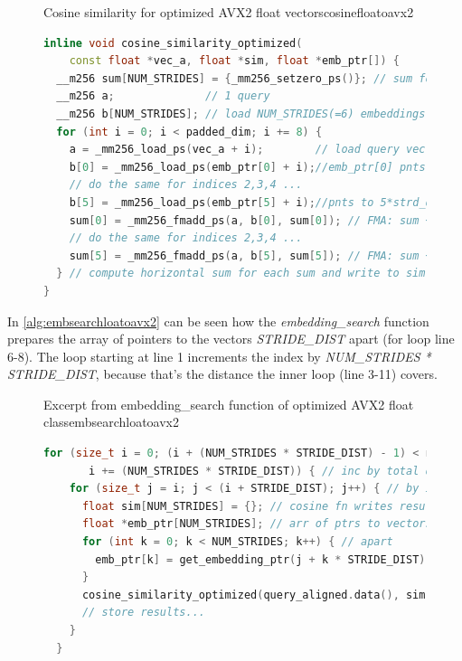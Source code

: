 \begin{figure}[h]
    \begin{algorithm}{Cosine similarity for optimized AVX2 float vectors}{cosinefloatoavx2}
        \begin{lstlisting}[language=C++]
inline void cosine_similarity_optimized(
    const float *vec_a, float *sim, float *emb_ptr[]) {
  __m256 sum[NUM_STRIDES] = {_mm256_setzero_ps()}; // sum for all embeds
  __m256 a;              // 1 query
  __m256 b[NUM_STRIDES]; // load NUM_STRIDES(=6) embeddings at once
  for (int i = 0; i < padded_dim; i += 8) {
    a = _mm256_load_ps(vec_a + i);        // load query vec
    b[0] = _mm256_load_ps(emb_ptr[0] + i);//emb_ptr[0] pnts to curr. vec
    // do the same for indices 2,3,4 ...
    b[5] = _mm256_load_ps(emb_ptr[5] + i);//pnts to 5*strd_dst vec ahead
    sum[0] = _mm256_fmadd_ps(a, b[0], sum[0]); // FMA: sum += a * b[0]
    // do the same for indices 2,3,4 ...
    sum[5] = _mm256_fmadd_ps(a, b[5], sum[5]); // FMA: sum += a * b[5]
  } // compute horizontal sum for each sum and write to sim array ...
}
    \end{lstlisting}
    \end{algorithm}
\end{figure}
In \autoref{alg:embsearchloatoavx2} can be seen how the \textit{embedding\_search} function prepares the array of pointers to the vectors \textit{STRIDE\_DIST} apart (for loop line 6-8).
The loop starting at line 1 increments the index by \textit{NUM\_STRIDES * STRIDE\_DIST}, because that's the distance the inner loop (line 3-11) covers.
\begin{figure}[h]
    \begin{algorithm}{Excerpt from embedding\_search function of optimized AVX2 float class}{embsearchloatoavx2}
        \begin{lstlisting}[language=C++]
for (size_t i = 0; (i + (NUM_STRIDES * STRIDE_DIST) - 1) < num_vectors;
       i += (NUM_STRIDES * STRIDE_DIST)) { // inc by total dist covered
    for (size_t j = i; j < (i + STRIDE_DIST); j++) { // by inner loop
      float sim[NUM_STRIDES] = {}; // cosine fn writes result into this
      float *emb_ptr[NUM_STRIDES]; // arr of ptrs to vectors STRIDE_DIST
      for (int k = 0; k < NUM_STRIDES; k++) { // apart
        emb_ptr[k] = get_embedding_ptr(j + k * STRIDE_DIST);
      }
      cosine_similarity_optimized(query_aligned.data(), sim, emb_ptr);
      // store results...
    }
  }
    \end{lstlisting}
    \end{algorithm}
\end{figure}

